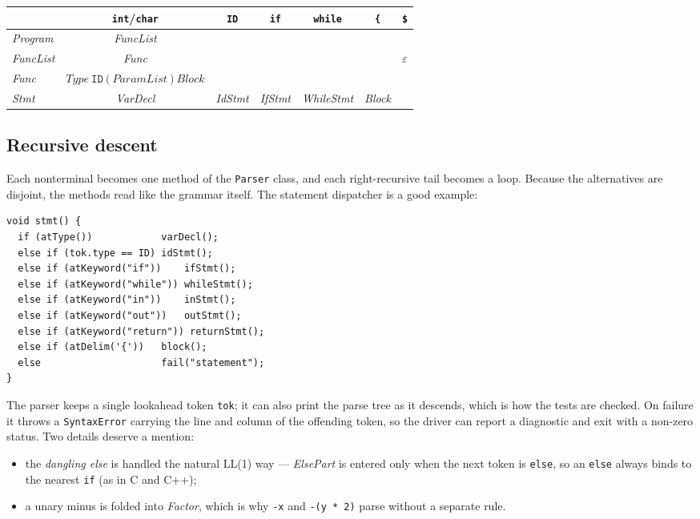 \documentclass[11pt]{article}
\begin{document}
\begin{center}
\begin{tabular}{@{}lcccccc@{}}
\toprule
 & \texttt{int}/\texttt{char} & \texttt{ID} & \texttt{if} & \texttt{while} & \texttt{\{} & \texttt{\$}\\
\midrule
\textit{Program}   & \textit{FuncList} &      &          &           &      & \\
\textit{FuncList}  & \textit{Func}     &      &          &           &      & $\varepsilon$\\
\textit{Func}      & $\mathit{Type}\ \texttt{ID}\ \texttt{(}\ \mathit{ParamList}\ \texttt{)}\ \mathit{Block}$ & & & & & \\
\textit{Stmt}      & \textit{VarDecl}  & \textit{IdStmt} & \textit{IfStmt} & \textit{WhileStmt} & \textit{Block} & \\
\bottomrule
\end{tabular}
\end{center}

\subsection{Recursive descent}
Each nonterminal becomes one method of the \texttt{Parser} class, and each
right-recursive tail becomes a loop. Because the alternatives are disjoint,
the methods read like the grammar itself. The statement dispatcher is a good
example:

\begin{lstlisting}
void stmt() {
  if (atType())            varDecl();
  else if (tok.type == ID) idStmt();
  else if (atKeyword("if"))    ifStmt();
  else if (atKeyword("while")) whileStmt();
  else if (atKeyword("in"))    inStmt();
  else if (atKeyword("out"))   outStmt();
  else if (atKeyword("return")) returnStmt();
  else if (atDelim('{'))   block();
  else                     fail("statement");
}
\end{lstlisting}

\noindent
The parser keeps a single lookahead token \texttt{tok}; it can also print the
parse tree as it descends, which is how the tests are checked. On failure it
throws a \texttt{SyntaxError} carrying the line and column of the offending
token, so the driver can report a diagnostic and exit with a non-zero status.
Two details deserve a mention:

\begin{itemize}
  \item the \emph{dangling else} is handled the natural LL(1) way ---
        \textit{ElsePart} is entered only when the next token is
        \texttt{else}, so an \texttt{else} always binds to the nearest
        \texttt{if} (as in C and C++);
  \item a unary minus is folded into \textit{Factor}, which is why
        \texttt{-x} and \texttt{-(y * 2)} parse without a separate rule.
\end{itemize}
\end{document}

